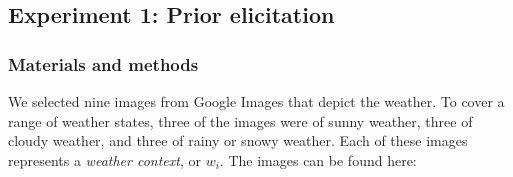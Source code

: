 \documentclass[10pt,letterpaper]{article}
\begin{document}



\subsection{Experiment 1: Prior elicitation}
\subsubsection{Materials and methods}
We selected nine images from Google Images that depict the weather. To cover a range of weather states, three of the images were of sunny weather, three of cloudy weather, and three of rainy or snowy weather. Each of these images represents a \emph{weather context}, or $w_i$. The images can be found here: 
\end{document}
